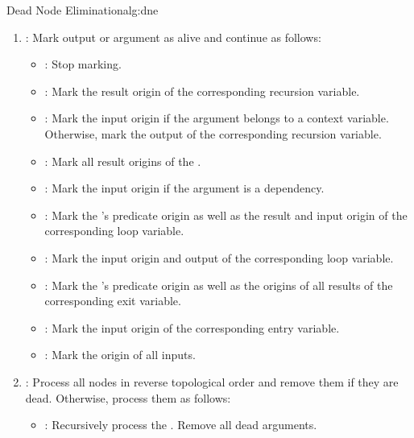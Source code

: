 \begin{informalg}{Dead Node Elimination}{alg:dne}
\begin{enumerate}
	\vspace*{-0.7\baselineskip}

	\item {}: Mark output or argument as alive and continue as follows:
		\begin{itemize}
			\item {}: Stop marking.

			\item {}: Mark the result origin of the corresponding recursion
				variable.

			\item {}: Mark the input origin if the argument belongs to a
				context variable. Otherwise, mark the output of the corresponding recursion variable.

			\item {}: Mark all result origins of the \lambdaregion.

			\item {}: Mark the input origin if the argument is a dependency.

			\item {}: Mark the \thetanode's predicate origin as well as the
				result and input origin of the corresponding loop variable.

			\item {}: Mark the input origin and output of the corresponding
				loop variable.

			\item {}: Mark the \gammanode's predicate origin as well as the
				origins of all results of the corresponding exit variable.

			\item {}: Mark the input origin of the corresponding entry
				variable.

			\item {}: Mark the origin of all inputs.
		\end{itemize}

	\item {}: Process all nodes in reverse topological order and remove them if they are
		dead. Otherwise, process them as follows:
		\begin{itemize}
			\item \bpoint{\omeganode}: Recursively process the \omegaregion. Remove all dead arguments.


\end{itemize}
\end{enumerate}
\end{informalg}
